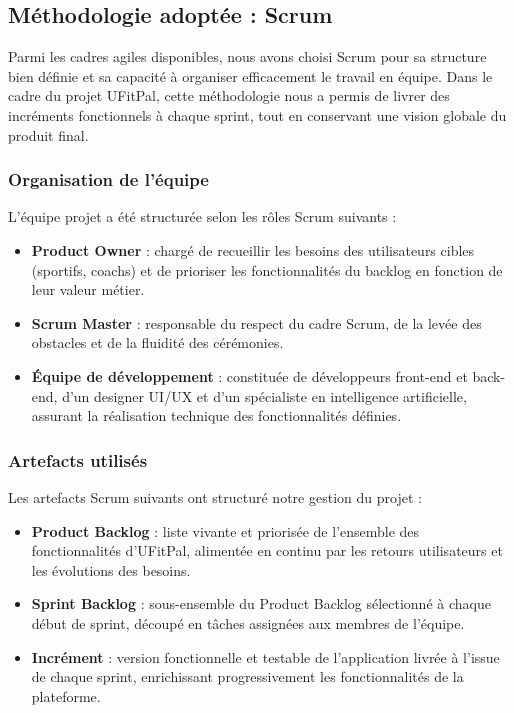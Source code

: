 \documentclass[a4paper,12pt]{report}
\begin{document}
\subsection{Méthodologie adoptée : Scrum}
Parmi les cadres agiles disponibles, nous avons choisi Scrum pour sa structure bien définie et sa capacité à organiser efficacement le travail en équipe.
 Dans le cadre du projet UFitPal, cette méthodologie nous a permis de livrer des incréments fonctionnels à chaque sprint,
  tout en conservant une vision globale du produit final.

\subsubsection{Organisation de l'équipe}
L'équipe projet a été structurée selon les rôles Scrum suivants :
\begin{itemize}
    \item \textbf{Product Owner} : chargé de recueillir les besoins des utilisateurs cibles 
    (sportifs, coachs) et de prioriser les fonctionnalités du backlog en fonction de leur 
    valeur métier.
    \item \textbf{Scrum Master} : responsable du respect du cadre Scrum, de la levée des 
    obstacles et de la fluidité des cérémonies.
    \item \textbf{Équipe de développement} : constituée de développeurs front-end et back-end, 
    d'un designer UI/UX et d'un spécialiste en intelligence artificielle, assurant la 
    réalisation technique des fonctionnalités définies.
\end{itemize}

\subsubsection{Artefacts utilisés}
Les artefacts Scrum suivants ont structuré notre gestion du projet :
\begin{itemize}
    \item \textbf{Product Backlog} : liste vivante et priorisée de l'ensemble des 
    fonctionnalités d'UFitPal, alimentée en continu par les retours utilisateurs et les 
    évolutions des besoins.
    \item \textbf{Sprint Backlog} : sous-ensemble du Product Backlog sélectionné à chaque 
    début de sprint, découpé en tâches assignées aux membres de l'équipe.
    \item \textbf{Incrément} : version fonctionnelle et testable de l'application livrée 
    à l'issue de chaque sprint, enrichissant progressivement les fonctionnalités de la 
    plateforme.
\end{itemize}
\end{document}

